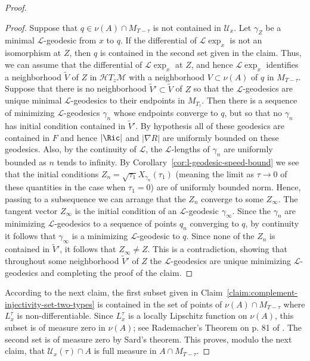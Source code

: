 \begin{proof}
\begin{proof}
Suppose that $q\in \nu(A)\cap M_{T-\tau}$ is not contained in ${\mathcal U}_x$.
Let $\gamma_Z$ be a minimal ${\mathcal L}$-geodesic  from $x$ to $q$. If the
differential of ${\mathcal L}\exp_x$ is not an isomorphism at $Z$, then
$q$ is contained in the second set given in the claim. Thus, we can assume that
the differential of ${\mathcal L}\exp_x$ at $Z$, and hence ${\mathcal
L}\exp_x$ identifies a neighborhood $\widetilde V$ of $Z$ in ${\mathcal
H}T_z{\mathcal M}$ with a neighborhood $V\subset \nu(A)$  of $q$ in
$M_{T-\tau}$. Suppose that there is no neighborhood $\widetilde V'\subset
\widetilde V$ of $Z$ so that the ${\mathcal L}$-geodesics are unique minimal
${\mathcal L}$-geodesics to their endpoints in $M_{T_\tau}$. Then there is a
sequence of minimizing ${\mathcal L}$-geodesics $\gamma_n$ whose endpoints
converge to $q$, but so that no $\gamma_n$ has initial condition contained in
$\widetilde V'$. By hypothesis all of these geodesics are contained in $F$ and
hence $|\Ric|$ and $|\nabla R|$ are uniformly bounded on these geodesics.
Also,  by the continuity of ${\mathcal L}$, the ${\mathcal L}$-lengths of
$\gamma_n$ are uniformly bounded as $n$ tends to infinity. By
Corollary~\ref{cor:l-geodesic-speed-bound} we see that the initial conditions
$Z_n=\sqrt{\tau_1}X_{\gamma_n}(\tau_1)$ (meaning the limit as $\tau\rightarrow
0$ of these quantities in the case when $\tau_1=0$) are of uniformly bounded
norm. Hence, passing to a subsequence we can arrange that the $Z_n$ converge to
some $Z_\infty$. The tangent vector $Z_\infty$ is the initial condition of an
${\mathcal L}$-geodesic $\gamma_\infty$. Since the $\gamma_n$ are minimizing
${\mathcal L}$-geodesics to a sequence of points $q_n$ converging to $q$, by
continuity it follows that $\gamma_\infty$ is a minimizing ${\mathcal
L}$-geodesic to $q$. Since none of the $Z_n$ is contained in $\widetilde V'$,
it follows that $Z_\infty\not= Z$. This is a contradiction, showing that
throughout some neighborhood $\widetilde V'$ of $Z$ the ${\mathcal
L}$-geodesics are unique minimizing ${\mathcal L}$-geodesics and completing the
proof of the claim.
\end{proof}

 According to the next claim, the first subset given in Claim~\ref{claim:complement-injectivity-set-two-types} is contained in the
set of points of $\nu(A)\cap M_{T-\tau}$ where $L_x^\tau$ is
non-differentiable. Since $L_x^\tau$ is a locally Lipschitz function on
$\nu(A)$, this subset is of measure zero in $\nu(A)$; see Rademacher's Theorem
on p. 81 of \cite{EvansGariepy}. The second set is of measure zero by Sard's
theorem. This proves, modulo the next claim, that ${\mathcal U}_x(\tau)\cap A$
is full measure in $A\cap M_{T-\tau}$.



\end{proof}
